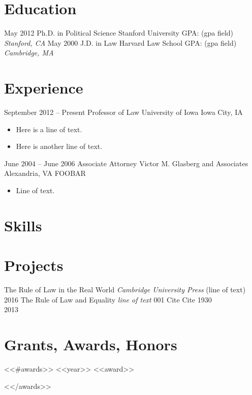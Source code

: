 \documentclass[letterpaper]{moderncv}
\begin{document}
\makecvtitle
\section{Education}
\cventry
{May 2012}
{Ph.D. in Political Science}
{Stanford University}
{GPA: (gpa field)}
{\textit{Stanford, CA}}
{}
\cventry
{May 2000}
{J.D. in Law}
{Harvard Law School}
{GPA: (gpa field)}
{\textit{Cambridge, MA}}
{}
\section{Experience}
\cventry
{September 2012 -- Present}
{Professor of Law}
{University of Iowa}
{Iowa City, IA}
{}
{\begin{itemize}%
	\item Here is a line of text.
	\item Here is another line of text.
	\end{itemize}}
\cventry
{June 2004 -- June 2006}
{Associate Attorney}
{Victor M. Glasberg and Associates}
{Alexandria, VA}
{FOOBAR}
{\begin{itemize}%
	\item Line of text.
	\end{itemize}}
\section{Skills}
\section{Projects}
\cventry
{}
{The Rule of Law in the Real World}
{}
{\textit{Cambridge University Press}}
{}
{(line of text)\\2016}
\vspace{1mm}
\cventry
{}
{The Rule of Law and Equality}
{}
{\textit{line of text}}
{}
{001 Cite Cite 1930\\2013}
\vspace{1mm}
\section{Grants, Awards, Honors}
<<#awards>>
\cvitem
{<<year>>}
{<<award>>}
\vspace{1mm}

<</awards>>

\ 
\end{document}
